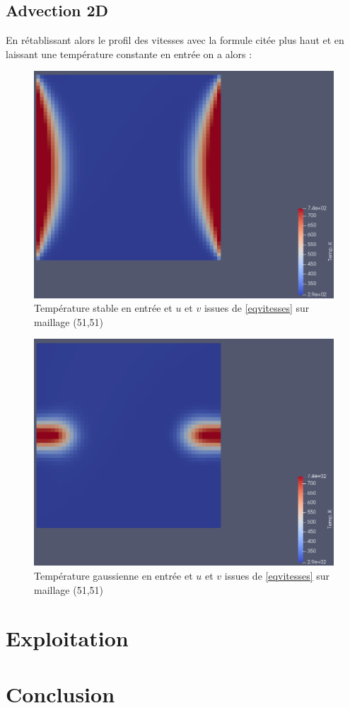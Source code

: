 \documentclass[a4paper,oneside]{article}
\begin{document}
\subsection{Advection 2D}
En rétablissant alors le profil des vitesses avec la formule citée plus haut et en laissant une température constante en entrée on a alors :

\begin{figure}[h!]
\centering
\includegraphics[scale=0.3]{Advection_2D/TemperatureStableEntree.png}
\caption{Température stable en entrée et $u$ et $v$ issues de \ref{eqvitesses} sur maillage (51,51)}
\end{figure}


\begin{figure}[h!]
\centering
\includegraphics[scale=0.3]{Advection_2D/TemperatureGaussienne.png}
\caption{Température gaussienne en entrée et $u$ et $v$ issues de \ref{eqvitesses} sur maillage (51,51)}
\end{figure}



\section{Exploitation}


\section{Conclusion}
\end{document}
